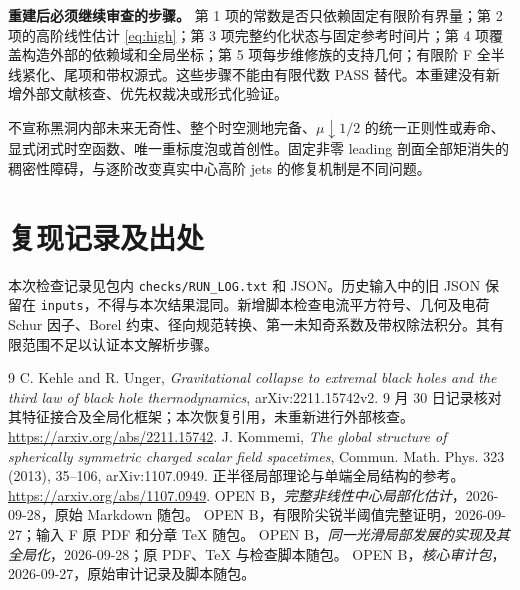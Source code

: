 \textbf{重建后必须继续审查的步骤。} 第 1 项的常数是否只依赖固定有限阶有界量；第 2 项的高阶线性估计 \eqref{eq:high}；第 3 项完整约化状态与固定参考时间片；第 4 项覆盖构造外部的依赖域和全局坐标；第 5 项每步维修族的支持几何；有限阶 F 全半线紧化、尾项和带权源式。这些步骤不能由有限代数 PASS 替代。本重建没有新增外部文献核查、优先权裁决或形式化验证。

不宣称黑洞内部未来无奇性、整个时空测地完备、$\mu\downarrow1/2$ 的统一正则性或寿命、显式闭式时空函数、唯一重标度泡或首创性。固定非零 leading 剖面全部矩消失的稠密性障碍，与逐阶改变真实中心高阶 jets 的修复机制是不同问题。

\section{复现记录及出处}
本次检查记录见包内 \texttt{checks/RUN\_LOG.txt} 和 JSON。历史输入中的旧 JSON 保留在 \texttt{inputs}，不得与本次结果混同。新增脚本检查电流平方符号、几何及电荷 Schur 因子、Borel 约束、径向规范转换、第一未知奇系数及带权除法积分。其有限范围不足以认证本文解析步骤。

\begingroup\footnotesize\linespread{1.0}\selectfont
\begin{thebibliography}{9}\setlength{\itemsep}{0pt}
 C. Kehle and R. Unger, \emph{Gravitational collapse to extremal black holes and the third law of black hole thermodynamics}, arXiv:2211.15742v2. 9 月 30 日记录核对其特征接合及全局化框架；本次恢复引用，未重新进行外部核查。\url{https://arxiv.org/abs/2211.15742}.
 J. Kommemi, \emph{The global structure of spherically symmetric charged scalar field spacetimes}, Commun. Math. Phys. 323 (2013), 35--106, arXiv:1107.0949. 正半径局部理论与单端全局结构的参考。\url{https://arxiv.org/abs/1107.0949}.
 OPEN B，\emph{完整非线性中心局部化估计}，2026-09-28，原始 Markdown 随包。
 OPEN B，有限阶尖锐半阈值完整证明，2026-09-27；输入 F 原 PDF 和分章 TeX 随包。
 OPEN B，\emph{同一光滑局部发展的实现及其全局化}，2026-09-28；原 PDF、TeX 与检查脚本随包。
 OPEN B，\emph{核心审计包}，2026-09-27，原始审计记录及脚本随包。
\end{thebibliography}
\endgroup
